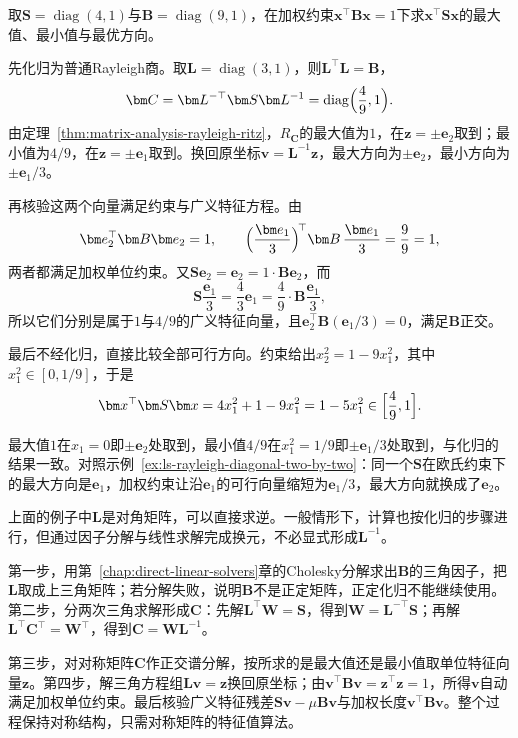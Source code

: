 \begin{example}[加权约束下的最优方向]
\label{ex:ls-generalized-rayleigh-diagonal}
取$\bm S=\operatorname{diag}(4,1)$与$\bm B=\operatorname{diag}(9,1)$，在加权约束$\bm x^\top\bm B\bm x=1$下求$\bm x^\top\bm S\bm x$的最大值、最小值与最优方向。

先化归为普通Rayleigh商。取$\bm L=\operatorname{diag}(3,1)$，则$\bm L^\top\bm L=\bm B$，
\[
 \bm C=\bm L^{-\top}\bm S\bm L^{-1}=\operatorname{diag}\Bigl(\frac49,1\Bigr).
\]
由定理~\ref{thm:matrix-analysis-rayleigh-ritz}，$R_{\bm C}$的最大值为$1$，在$\bm z=\pm\bm e_2$取到；最小值为$4/9$，在$\bm z=\pm\bm e_1$取到。换回原坐标$\bm v=\bm L^{-1}\bm z$，最大方向为$\pm\bm e_2$，最小方向为$\pm\bm e_1/3$。

再核验这两个向量满足约束与广义特征方程。由
\[
 \bm e_2^\top\bm B\bm e_2=1,\qquad \Bigl(\frac{\bm e_1}{3}\Bigr)^{\!\top}\bm B\,\frac{\bm e_1}{3}=\frac99=1,
\]
两者都满足加权单位约束。又$\bm S\bm e_2=\bm e_2=1\cdot\bm B\bm e_2$，而
\[
 \bm S\frac{\bm e_1}{3}=\frac43\bm e_1=\frac49\cdot\bm B\frac{\bm e_1}{3},
\]
所以它们分别是属于$1$与$4/9$的广义特征向量，且$\bm e_2^\top\bm B(\bm e_1/3)=0$，满足$\bm B$正交。

最后不经化归，直接比较全部可行方向。约束给出$x_2^2=1-9x_1^2$，其中$x_1^2\in[0,1/9]$，于是
\[
 \bm x^\top\bm S\bm x=4x_1^2+1-9x_1^2=1-5x_1^2\in\Bigl[\frac49,1\Bigr].
\]

最大值$1$在$x_1=0$即$\pm\bm e_2$处取到，最小值$4/9$在$x_1^2=1/9$即$\pm\bm e_1/3$处取到，与化归的结果一致。对照示例~\ref{ex:ls-rayleigh-diagonal-two-by-two}：同一个$\bm S$在欧氏约束下的最大方向是$\bm e_1$，加权约束让沿$\bm e_1$的可行向量缩短为$\bm e_1/3$，最大方向就换成了$\bm e_2$。
\end{example}

上面的例子中$\bm L$是对角矩阵，可以直接求逆。一般情形下，计算也按化归的步骤进行，但通过因子分解与线性求解完成换元，不必显式形成$\bm L^{-1}$。

第一步，用第~\ref{chap:direct-linear-solvers}章的Cholesky分解求出$\bm B$的三角因子，把$\bm L$取成上三角矩阵；若分解失败，说明$\bm B$不是正定矩阵，正定化归不能继续使用。第二步，分两次三角求解形成$\bm C$：先解$\bm L^\top\bm W=\bm S$，得到$\bm W=\bm L^{-\top}\bm S$；再解$\bm L^\top\bm C^\top=\bm W^\top$，得到$\bm C=\bm W\bm L^{-1}$。

第三步，对对称矩阵$\bm C$作正交谱分解，按所求的是最大值还是最小值取单位特征向量$\bm z$。第四步，解三角方程组$\bm L\bm v=\bm z$换回原坐标；由$\bm v^\top\bm B\bm v=\bm z^\top\bm z=1$，所得$\bm v$自动满足加权单位约束。最后核验广义特征残差$\bm S\bm v-\mu\bm B\bm v$与加权长度$\bm v^\top\bm B\bm v$。整个过程保持对称结构，只需对称矩阵的特征值算法。

